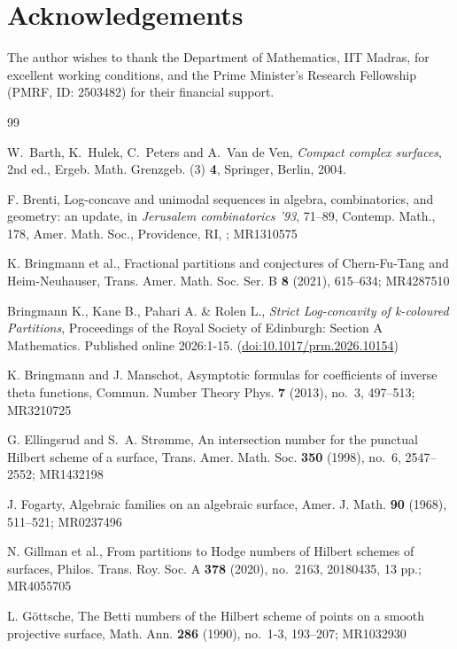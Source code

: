\documentclass[12pt]{amsart}
\theoremstyle{plain}
\theoremstyle{definition}
\theoremstyle{remark}
\begin{document}
\section*{Acknowledgements}

The author wishes to thank the Department of Mathematics, IIT Madras, for excellent working conditions, and the Prime Minister's Research Fellowship (PMRF, ID: 2503482) for their financial support.


\begin{thebibliography}{99}

W.~Barth, K.~Hulek, C.~Peters and A.~Van de Ven,
\emph{Compact complex surfaces},
2nd ed., Ergeb. Math. Grenzgeb. (3) \textbf{4},
Springer, Berlin, 2004.

F. Brenti, Log-concave and unimodal sequences in algebra, combinatorics, and geometry: an update, in {\it Jerusalem combinatorics '93}, 71--89, Contemp. Math., 178, Amer. Math. Soc., Providence, RI, ; MR1310575

K. Bringmann et al., Fractional partitions and conjectures of Chern-Fu-Tang and Heim-Neuhauser, Trans. Amer. Math. Soc. Ser. B {\bf 8} (2021), 615--634; MR4287510

Bringmann K., Kane B., Pahari A. \& Rolen L., {\em Strict Log-concavity of k-coloured Partitions}, Proceedings of the Royal Society of Edinburgh: Section A Mathematics. Published online 2026:1-15. (\url{doi:10.1017/prm.2026.10154}) 

K. Bringmann and J. Manschot, Asymptotic formulas for coefficients of inverse theta functions, Commun. Number Theory Phys. {\bf 7} (2013), no.~3, 497--513; MR3210725

G. Ellingsrud and S.~A. Str\o mme, An intersection number for the punctual Hilbert scheme of a surface, Trans. Amer. Math. Soc. {\bf 350} (1998), no.~6, 2547--2552; MR1432198

J. Fogarty, Algebraic families on an algebraic surface, Amer. J. Math. {\bf 90} (1968), 511--521; MR0237496

N. Gillman et al., From partitions to Hodge numbers of Hilbert schemes of surfaces, Philos. Trans. Roy. Soc. A {\bf 378} (2020), no.~2163, 20180435, 13 pp.; MR4055705

L. G\"ottsche, The Betti numbers of the Hilbert scheme of points on a smooth projective surface, Math. Ann. {\bf 286} (1990), no.~1-3, 193--207; MR1032930


\end{thebibliography}
\end{document}
